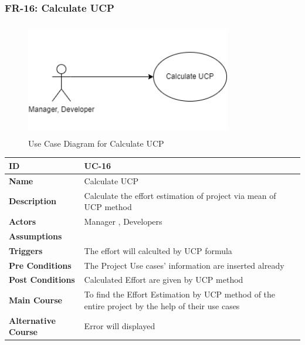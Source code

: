     \subsubsection{FR-16: Calculate UCP}
    \begin{figure}[H]
        \includegraphics[height=5cm, width=0.8\textwidth]{./diagrams/Use Case/u16.png}
        \centering 
        \caption{Use Case Diagram for Calculate UCP}
        \label{fig:Usecase1}
        \end{figure}
        
    \begin{center}
        \begin{tabularx}{\textwidth}{|l|X|}
            \hline
            \textbf{ID} & UC-16 \\
            \hline
            \textbf{Name} & Calculate UCP \\
            \hline
            \textbf{Description} & Calculate the effort estimation of project via mean of UCP method \\
            \hline
            \textbf{Actors} & Manager , Developers \\
            \hline
            \textbf{Assumptions} &  \\
            \hline
            \textbf{Triggers} & The effort will calculted by UCP formula \\
            \hline
            \textbf{Pre Conditions} & The Project Use cases' information are inserted already \\
            \hline
            \textbf{Post Conditions} & Calculated Effort are given by UCP method  \\
            \hline
            \textbf{Main Course} & To find the Effort Estimation by UCP method of the entire project by the help of their use cases \\
            \hline
            \textbf{Alternative Course} & Error will displayed \\
            \hline
            
        \end{tabularx}
    \end{center}
    
